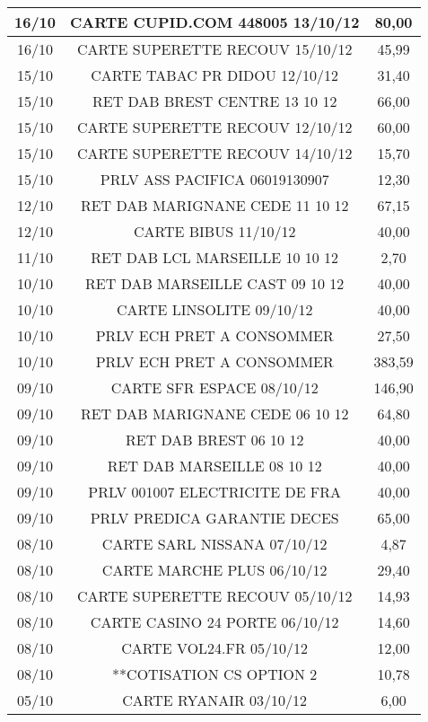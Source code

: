 \begin{tabular}{|c|c|c|}
\hline
16/10 & CARTE CUPID.COM 448005 13/10/12 & 80,00 \\
\hline
16/10 & CARTE SUPERETTE RECOUV 15/10/12 & 45,99 \\
\hline
15/10 & CARTE TABAC PR DIDOU   12/10/12 & 31,40 \\
\hline
15/10 & RET DAB BREST CENTRE   13 10 12 & 66,00 \\
\hline
15/10 & CARTE SUPERETTE RECOUV 12/10/12 & 60,00 \\
\hline
15/10 & CARTE SUPERETTE RECOUV 14/10/12 & 15,70 \\
\hline
15/10 & PRLV   ASS PACIFICA  06019130907 & 12,30 \\
\hline
12/10 & RET DAB MARIGNANE CEDE 11 10 12 & 67,15 \\
\hline
12/10 & CARTE BIBUS            11/10/12 & 40,00 \\
\hline
11/10 & RET DAB LCL MARSEILLE  10 10 12 & 2,70 \\
\hline
10/10 & RET DAB MARSEILLE CAST 09 10 12 & 40,00 \\
\hline
10/10 & CARTE LINSOLITE        09/10/12 & 40,00 \\
\hline
10/10 & PRLV ECH PRET A CONSOMMER & 27,50 \\
\hline
10/10 & PRLV ECH PRET A CONSOMMER & 383,59 \\
\hline
09/10 & CARTE SFR ESPACE       08/10/12 & 146,90 \\
\hline
09/10 & RET DAB MARIGNANE CEDE 06 10 12 & 64,80 \\
\hline
09/10 & RET DAB BREST          06 10 12 & 40,00 \\
\hline
09/10 & RET DAB MARSEILLE      08 10 12 & 40,00 \\
\hline
09/10 & PRLV 001007   ELECTRICITE DE FRA & 40,00 \\
\hline
09/10 & PRLV   PREDICA GARANTIE DECES & 65,00 \\
\hline
08/10 & CARTE SARL NISSANA     07/10/12 & 4,87 \\
\hline
08/10 & CARTE MARCHE PLUS      06/10/12 & 29,40 \\
\hline
08/10 & CARTE SUPERETTE RECOUV 05/10/12 & 14,93 \\
\hline
08/10 & CARTE CASINO 24 PORTE  06/10/12 & 14,60 \\
\hline
08/10 & CARTE VOL24.FR         05/10/12 & 12,00 \\
\hline
08/10 & **COTISATION CS OPTION 2 & 10,78 \\
\hline
05/10 & CARTE RYANAIR          03/10/12 & 6,00 \\

\end{tabular}
